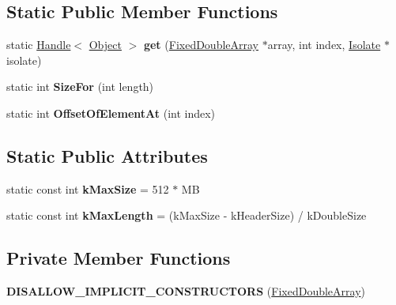 \subsection*{Static Public Member Functions}
\begin{DoxyCompactItemize}
\item 
static \hyperlink{classv8_1_1internal_1_1_handle}{Handle}$<$ \hyperlink{classv8_1_1internal_1_1_object}{Object} $>$ {\bfseries get} (\hyperlink{classv8_1_1internal_1_1_fixed_double_array}{Fixed\+Double\+Array} $\ast$array, int index, \hyperlink{classv8_1_1internal_1_1_isolate}{Isolate} $\ast$isolate)\hypertarget{classv8_1_1internal_1_1_fixed_double_array_acd667a26f5eb78465e66ba5efaccfdb9}{}\label{classv8_1_1internal_1_1_fixed_double_array_acd667a26f5eb78465e66ba5efaccfdb9}

\item 
static int {\bfseries Size\+For} (int length)\hypertarget{classv8_1_1internal_1_1_fixed_double_array_ad43d5cfebc4805de874b189cf2c94055}{}\label{classv8_1_1internal_1_1_fixed_double_array_ad43d5cfebc4805de874b189cf2c94055}

\item 
static int {\bfseries Offset\+Of\+Element\+At} (int index)\hypertarget{classv8_1_1internal_1_1_fixed_double_array_aea74d64b36ea2275796e59287e418316}{}\label{classv8_1_1internal_1_1_fixed_double_array_aea74d64b36ea2275796e59287e418316}

\end{DoxyCompactItemize}
\subsection*{Static Public Attributes}
\begin{DoxyCompactItemize}
\item 
static const int {\bfseries k\+Max\+Size} = 512 $\ast$ MB\hypertarget{classv8_1_1internal_1_1_fixed_double_array_a857be21c642353c126dddfd6dd2e672b}{}\label{classv8_1_1internal_1_1_fixed_double_array_a857be21c642353c126dddfd6dd2e672b}

\item 
static const int {\bfseries k\+Max\+Length} = (k\+Max\+Size -\/ k\+Header\+Size) / k\+Double\+Size\hypertarget{classv8_1_1internal_1_1_fixed_double_array_af65b3ad9319ef84e8ae0f878b7556d92}{}\label{classv8_1_1internal_1_1_fixed_double_array_af65b3ad9319ef84e8ae0f878b7556d92}

\end{DoxyCompactItemize}
\subsection*{Private Member Functions}
\begin{DoxyCompactItemize}
\item 
{\bfseries D\+I\+S\+A\+L\+L\+O\+W\+\_\+\+I\+M\+P\+L\+I\+C\+I\+T\+\_\+\+C\+O\+N\+S\+T\+R\+U\+C\+T\+O\+RS} (\hyperlink{classv8_1_1internal_1_1_fixed_double_array}{Fixed\+Double\+Array})\hypertarget{classv8_1_1internal_1_1_fixed_double_array_a482935aaf2378f46f1f3b0d54fb5fe09}{}\label{classv8_1_1internal_1_1_fixed_double_array_a482935aaf2378f46f1f3b0d54fb5fe09}

\end{DoxyCompactItemize}
